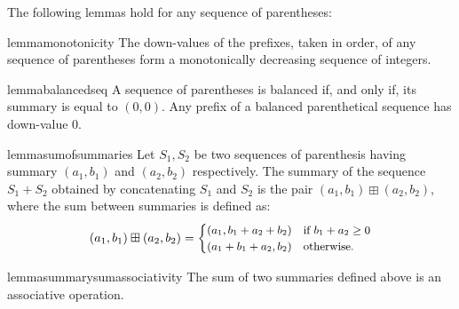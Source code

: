 \documentclass[a4paper,USenglish]{lipics}
\begin{document}
		The following lemmas hold for any sequence of parentheses:


\begin{restatable}{lemma}{monotonicity}
\label{lem:monotonicity}
	The down-values of the prefixes, taken in order, of any sequence of parentheses form a monotonically decreasing sequence of integers.
\end{restatable}
		
\begin{restatable}{lemma}{balancedseq}
			\label{lem:balancedseq}
			A sequence of parentheses is balanced if, and only if, its summary is equal to $(0,0)$. Any prefix of a balanced parenthetical sequence has down-value 0.
\end{restatable}

\begin{restatable}{lemma}{sumofsummaries}
\label{lem:sumofsummaries}
			Let $S_1, S_2$ be two sequences of parenthesis having summary $(a_1,b_1)$ and $(a_2,b_2)$ respectively. The summary of the sequence $S_1 + S_2$ obtained by concatenating $S_1$ and $S_2$ is the pair $(a_1,b_1) \boxplus (a_2,b_2)$, where the sum between summaries is defined as:
			$$\small (a_1, b_1) \boxplus (a_2, b_2) = \begin{cases}
				(a_1, b_1 + a_2 + b_2) & \text{if }b_1 + a_2 \ge 0\\
				(a_1 + b_1 + a_2, b_2) & \text{otherwise.}
			\end{cases}
			$$
\end{restatable}


		
\begin{restatable}{lemma}{summarysumassociativity}
			\label{lem:summarysumassociativity}
			The sum of two summaries defined above is an associative operation.
\end{restatable}
		
\end{document}
